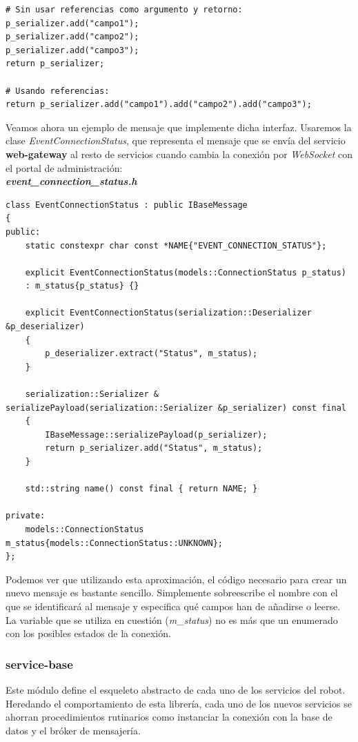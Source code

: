 \begin{lstlisting}
# Sin usar referencias como argumento y retorno:	
p_serializer.add("campo1");	
p_serializer.add("campo2");	
p_serializer.add("campo3");
return p_serializer;

# Usando referencias:
return p_serializer.add("campo1").add("campo2").add("campo3");
\end{lstlisting}

Veamos ahora un ejemplo de mensaje que implemente dicha interfaz. Usaremos la clase \textit{EventConnectionStatus}, que representa el mensaje que se envía del servicio \textbf{web-gateway} al resto de servicios cuando cambia la conexión por \textit{WebSocket} con el portal de administración:\\

\textbf{\textit{event\_connection\_status.h}} \cite{event-connection-status}
\begin{lstlisting}
class EventConnectionStatus : public IBaseMessage
{
public:
	static constexpr char const *NAME{"EVENT_CONNECTION_STATUS"};
	
	explicit EventConnectionStatus(models::ConnectionStatus p_status)
	: m_status{p_status} {}
	
	explicit EventConnectionStatus(serialization::Deserializer &p_deserializer)
	{
		p_deserializer.extract("Status", m_status);
	}
	
	serialization::Serializer & serializePayload(serialization::Serializer &p_serializer) const final
	{
		IBaseMessage::serializePayload(p_serializer);
		return p_serializer.add("Status", m_status);
	}
	
	std::string name() const final { return NAME; }
	
private:
	models::ConnectionStatus m_status{models::ConnectionStatus::UNKNOWN};
};
\end{lstlisting}

Podemos ver que utilizando esta aproximación, el código necesario para crear un nuevo mensaje es bastante sencillo. Simplemente sobreescribe el nombre con el que se identificará al mensaje y especifica qué campos han de añadirse o leerse. La variable que se utiliza en cuestión (\emph{m\_status}) no es más que un enumerado con los posibles estados de la conexión.


\subsubsection{service-base}

Este módulo define el esqueleto abstracto de cada uno de los servicios del robot. Heredando el comportamiento de esta librería, cada uno de los nuevos servicios se ahorran procedimientos rutinarios como instanciar la conexión con la base de datos y el bróker de mensajería.

